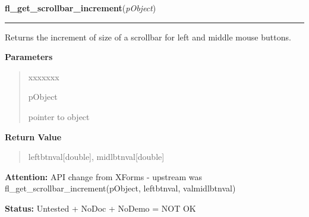 \hspace{.8\funcindent}\begin{boxedminipage}{\funcwidth}

    \raggedright \textbf{fl\_get\_scrollbar\_increment}(\textit{pObject})

    \vspace{-1.5ex}

    \rule{\textwidth}{0.5\fboxrule}
\setlength{\parskip}{2ex}
    Returns the increment of size of a scrollbar for left and middle mouse 
    buttons.

\setlength{\parskip}{1ex}
      \textbf{Parameters}
      \vspace{-1ex}

      \begin{quote}
        \begin{Ventry}{xxxxxxx}

          \item[pObject]

          pointer to object

        \end{Ventry}

      \end{quote}

      \textbf{Return Value}
    \vspace{-1ex}

      \begin{quote}
      leftbtnval[double], midlbtnval[double]

      \end{quote}

\textbf{Attention:} API change from XForms - upstream was 
fl\_get\_scrollbar\_increment(pObject, leftbtnval, valmidlbtnval)



\textbf{Status:} Untested + NoDoc + NoDemo = NOT OK



    \end{boxedminipage}

    \label{xformslib:library:fl_set_scrollbar_bounds}

    \vspace{0.5ex}

